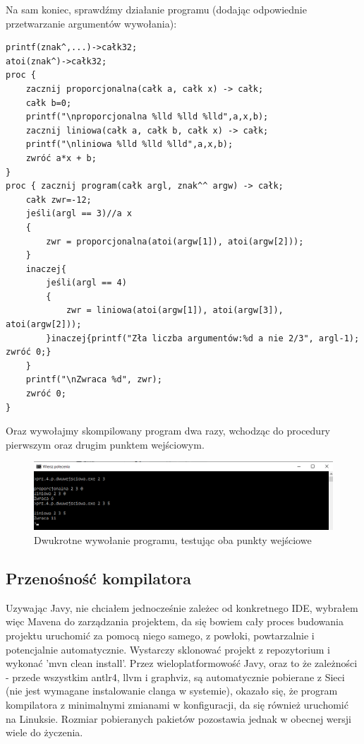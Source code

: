 Na sam koniec, sprawdźmy działanie programu (dodając odpowiednie przetwarzanie argumentów wywołania):
\begin{lstlisting}
printf(znak^,...)->całk32;
atoi(znak^)->całk32;
proc {
    zacznij proporcjonalna(całk a, całk x) -> całk;
    całk b=0;
    printf("\nproporcjonalna %lld %lld %lld",a,x,b);
    zacznij liniowa(całk a, całk b, całk x) -> całk;
    printf("\nliniowa %lld %lld %lld",a,x,b);
    zwróć a*x + b;
}
proc { zacznij program(całk argl, znak^^ argw) -> całk;
    całk zwr=-12;
    jeśli(argl == 3)//a x
    {
        zwr = proporcjonalna(atoi(argw[1]), atoi(argw[2]));
    }
    inaczej{
        jeśli(argl == 4)
        {
            zwr = liniowa(atoi(argw[1]), atoi(argw[3]), atoi(argw[2]));
        }inaczej{printf("Zła liczba argumentów:%d a nie 2/3", argl-1); zwróć 0;}
    }
    printf("\nZwraca %d", zwr);
    zwróć 0;
}
\end{lstlisting}
Oraz wywołajmy skompilowany program dwa razy, wchodząc do procedury pierwszym oraz drugim punktem wejściowym.
\begin{figure}[H]
    \centering
    \includegraphics[width=1.0\textwidth]{images/2.rozdzielacz/cmdzrz.png}
    \caption{Dwukrotne wywołanie programu, testując oba punkty wejściowe}
\end{figure}

\subsection{Przenośność kompilatora}
Uzywając Javy, nie chciałem jednocześnie zależec od konkretnego IDE, wybrałem więc Mavena do zarządzania projektem, da się bowiem cały proces budowania projektu uruchomić za pomocą niego samego, z powłoki, powtarzalnie i potencjalnie automatycznie. Wystarczy sklonować projekt z repozytorium i wykonać 'mvn clean install'. Przez wieloplatformowość Javy, oraz to że zależności - przede wszystkim antlr4, llvm i graphviz, są automatycznie pobierane z Sieci (nie jest wymagane instalowanie clanga w systemie), okazało się, że program kompilatora z minimalnymi zmianami w konfiguracji, da się również uruchomić na Linuksie. Rozmiar pobieranych pakietów pozostawia jednak w obecnej wersji wiele do życzenia.
